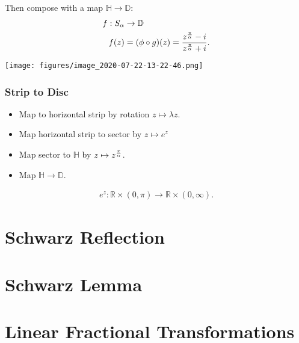 Then compose with a map \({\mathbb{H}}\to{\mathbb{D}}\):
\begin{align*}
f: S_\alpha &\to {\mathbb{D}}\\
f(z) &= (\phi \circ g)(z) = {z^{\pi\over \alpha} - i \over z^{\pi\over\alpha} + i}
.\end{align*}

\texttt{[image: figures/image\_2020-07-22-13-22-46.png]}

\hypertarget{strip-to-disc}{%
\subsubsection{Strip to Disc}\label{strip-to-disc}}

\begin{itemize}
\tightlist
\item
  Map to horizontal strip by rotation \(z\mapsto \lambda z\).
\item
  Map horizontal strip to sector by \(z \mapsto e^z\)
\item
  Map sector to \({\mathbb{H}}\) by \(z\mapsto z^{\pi\over\alpha}\).
\item
  Map \({\mathbb{H}}\to{\mathbb{D}}\).
\end{itemize}

\begin{align*}
e^z: {\mathbb{R}}\times(0, \pi) \to {\mathbb{R}}\times(0, \infty)
.\end{align*}

\hypertarget{schwarz-reflection}{%
\section{Schwarz Reflection}\label{schwarz-reflection}}


\hypertarget{schwarz-lemma}{%
\section{Schwarz Lemma}\label{schwarz-lemma}}






\hypertarget{linear-fractional-transformations-1}{%
\section{Linear Fractional
Transformations}\label{linear-fractional-transformations-1}}

